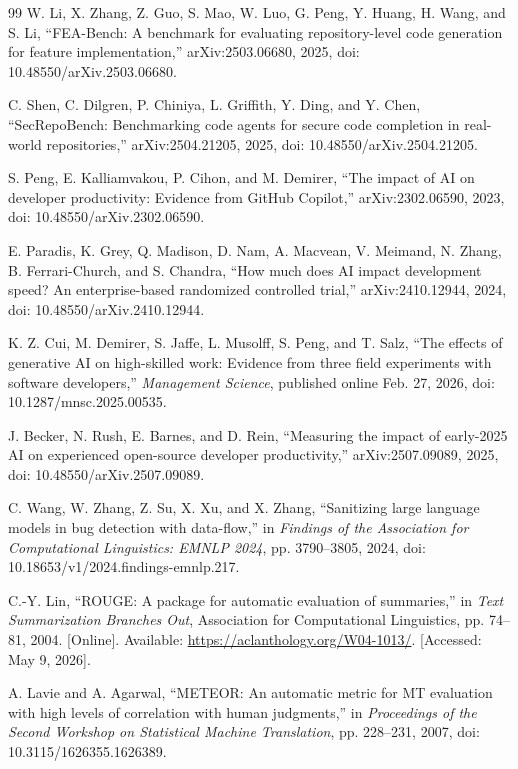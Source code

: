 \documentclass[preprint,12pt]{elsarticle}
\begin{document}
\begin{thebibliography}{99}
 W. Li, X. Zhang, Z. Guo, S. Mao, W. Luo, G. Peng, Y. Huang, H. Wang, and S. Li, ``FEA-Bench: A benchmark for evaluating repository-level code generation for feature implementation,'' arXiv:2503.06680, 2025, doi: 10.48550/arXiv.2503.06680.

 C. Shen, C. Dilgren, P. Chiniya, L. Griffith, Y. Ding, and Y. Chen, ``SecRepoBench: Benchmarking code agents for secure code completion in real-world repositories,'' arXiv:2504.21205, 2025, doi: 10.48550/arXiv.2504.21205.

 S. Peng, E. Kalliamvakou, P. Cihon, and M. Demirer, ``The impact of AI on developer productivity: Evidence from GitHub Copilot,'' arXiv:2302.06590, 2023, doi: 10.48550/arXiv.2302.06590.

 E. Paradis, K. Grey, Q. Madison, D. Nam, A. Macvean, V. Meimand, N. Zhang, B. Ferrari-Church, and S. Chandra, ``How much does AI impact development speed? An enterprise-based randomized controlled trial,'' arXiv:2410.12944, 2024, doi: 10.48550/arXiv.2410.12944.

 K. Z. Cui, M. Demirer, S. Jaffe, L. Musolff, S. Peng, and T. Salz, ``The effects of generative AI on high-skilled work: Evidence from three field experiments with software developers,'' \textit{Management Science}, published online Feb. 27, 2026, doi: 10.1287/mnsc.2025.00535.

 J. Becker, N. Rush, E. Barnes, and D. Rein, ``Measuring the impact of early-2025 AI on experienced open-source developer productivity,'' arXiv:2507.09089, 2025, doi: 10.48550/arXiv.2507.09089.

 C. Wang, W. Zhang, Z. Su, X. Xu, and X. Zhang, ``Sanitizing large language models in bug detection with data-flow,'' in \textit{Findings of the Association for Computational Linguistics: EMNLP 2024}, pp. 3790--3805, 2024, doi: 10.18653/v1/2024.findings-emnlp.217.

 C.-Y. Lin, ``ROUGE: A package for automatic evaluation of summaries,'' in \textit{Text Summarization Branches Out}, Association for Computational Linguistics, pp. 74--81, 2004. [Online]. Available: \url{https://aclanthology.org/W04-1013/}. [Accessed: May 9, 2026].

 A. Lavie and A. Agarwal, ``METEOR: An automatic metric for MT evaluation with high levels of correlation with human judgments,'' in \textit{Proceedings of the Second Workshop on Statistical Machine Translation}, pp. 228--231, 2007, doi: 10.3115/1626355.1626389.


\end{thebibliography}
\end{document}
